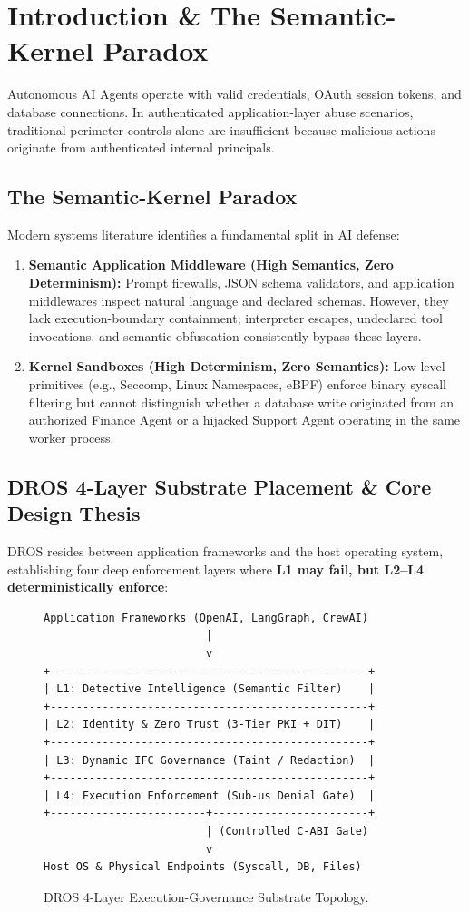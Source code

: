 \documentclass[conference]{IEEEtran}
\begin{document}
\section{Introduction \& The Semantic-Kernel Paradox}
Autonomous AI Agents operate with valid credentials, OAuth session tokens, and database connections. In authenticated application-layer abuse scenarios, traditional perimeter controls alone are insufficient because malicious actions originate from authenticated internal principals.

\subsection{The Semantic-Kernel Paradox}
Modern systems literature identifies a fundamental split in AI defense:
\begin{enumerate}
    \item \textbf{Semantic Application Middleware (High Semantics, Zero Determinism):} Prompt firewalls, JSON schema validators, and application middlewares inspect natural language and declared schemas. However, they lack execution-boundary containment; interpreter escapes, undeclared tool invocations, and semantic obfuscation consistently bypass these layers.
    \item \textbf{Kernel Sandboxes (High Determinism, Zero Semantics):} Low-level primitives (e.g., Seccomp, Linux Namespaces, eBPF) enforce binary syscall filtering but cannot distinguish whether a database write originated from an authorized Finance Agent or a hijacked Support Agent operating in the same worker process.
\end{enumerate}

\subsection{DROS 4-Layer Substrate Placement \& Core Design Thesis}
DROS resides between application frameworks and the host operating system, establishing four deep enforcement layers where \textbf{L1 may fail, but L2--L4 deterministically enforce}:

\begin{figure}[!t]
\centering
\begin{minipage}{0.95\columnwidth}
\footnotesize
\begin{verbatim}
Application Frameworks (OpenAI, LangGraph, CrewAI)
                         |
                         v
+-------------------------------------------------+
| L1: Detective Intelligence (Semantic Filter)    |
+-------------------------------------------------+
| L2: Identity & Zero Trust (3-Tier PKI + DIT)    |
+-------------------------------------------------+
| L3: Dynamic IFC Governance (Taint / Redaction)  |
+-------------------------------------------------+
| L4: Execution Enforcement (Sub-us Denial Gate)  |
+------------------------+------------------------+
                         | (Controlled C-ABI Gate)
                         v
Host OS & Physical Endpoints (Syscall, DB, Files)
\end{verbatim}
\end{minipage}
\caption{DROS 4-Layer Execution-Governance Substrate Topology.}
\label{fig:dros_topology}
\end{figure}
\end{document}
